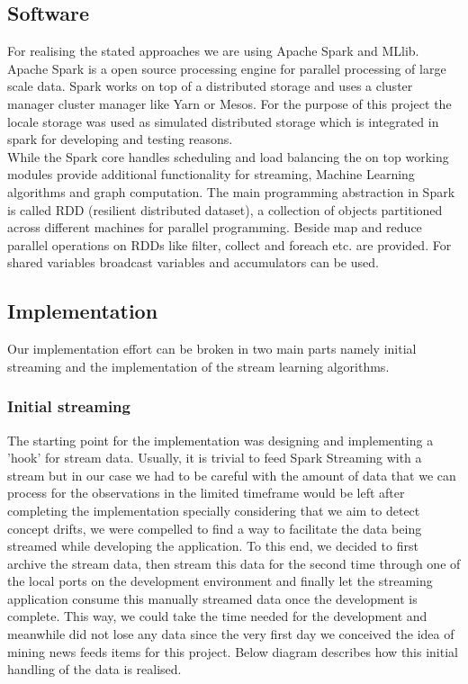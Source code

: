 \documentclass{article} %
\begin{document}
\subsection{Software}
For realising the stated approaches we are using Apache Spark and MLlib. Apache Spark is a open source processing engine for parallel processing of large scale data. Spark works on top of a distributed storage and uses a cluster manager cluster manager like Yarn or Mesos. For the purpose of this project the locale storage was used as simulated distributed storage which is integrated in spark for developing and testing reasons.  \\
While the Spark core handles scheduling and load balancing the on top working modules provide additional functionality for streaming, Machine Learning  algorithms and graph computation. The main programming abstraction in Spark is called RDD (resilient distributed dataset), a collection of objects partitioned across different machines for parallel programming. Beside map and reduce parallel operations on RDDs like filter, collect and foreach etc. are provided. For shared variables broadcast variables and  accumulators can be used.

\subsection{Implementation}

Our implementation effort can be broken in two main parts namely initial streaming and the implementation of the stream learning algorithms.

\subsubsection{Initial streaming}

The starting point for the implementation was designing and implementing a 'hook' for stream data. Usually, it is trivial to feed Spark Streaming with a stream but in our case we had to be careful with the amount of data that we can process for the observations in the limited timeframe would be left after completing the implementation  specially considering that we aim to detect concept drifts, we were compelled to find a way to facilitate the data being streamed while developing the application. To this end, we decided to first archive the stream data, then stream this data for the second time through one of the local ports on the development environment and finally let the streaming application consume this manually streamed data once the development is complete. This way, we could take the time needed for the development and meanwhile did not lose any data since the very first day we conceived the idea of mining news feeds items for this project. Below diagram describes how this initial handling of the data is realised. 
\end{document}

